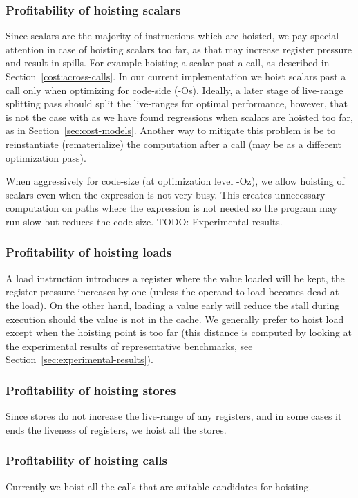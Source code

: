 \documentclass{sig-alternate}
\begin{document}
\subsubsection{Profitability of hoisting scalars}
Since scalars are the majority of instructions which are hoisted, we pay special
attention in case of hoisting scalars too far, as that may increase register
pressure and result in spills. For example hoisting a scalar past a call, as
described in Section~\ref{cost:across-calls}.  In our current implementation we
hoist scalars past a call only when optimizing for code-side (-Os). Ideally, a
later stage of live-range splitting pass should split the live-ranges for
optimal performance, however, that is not the case with \LLVM{} as we have found
regressions when scalars are hoisted too far, as in
Section~\ref{sec:cost-models}. Another way to mitigate this problem is be to
reinstantiate (rematerialize) the computation after a call (may be as a
different optimization pass).

When aggressively for code-size (at optimization level -Oz), we allow hoisting
of scalars even when the expression is not very busy. This creates unnecessary
computation on paths where the expression is not needed so the program may run slow
but reduces the code size. TODO: Experimental results.

\subsubsection{Profitability of hoisting loads}
A load instruction introduces a register where the value loaded will be kept,
the register pressure increases by one (unless the operand to load becomes dead
at the load). On the other hand, loading a value early will reduce the stall
during execution should the value is not in the cache. We generally prefer to
hoist load except when the hoisting point is too far (this distance is computed by
looking at the experimental results of representative benchmarks, see
Section~\ref{sec:experimental-results}).

\subsubsection{Profitability of hoisting stores}
Since stores do not increase the live-range of any registers, and in some cases
it ends the liveness of registers, we hoist all the stores.

\subsubsection{Profitability of hoisting calls}
Currently we hoist all the calls that are suitable candidates for hoisting.
\end{document}
